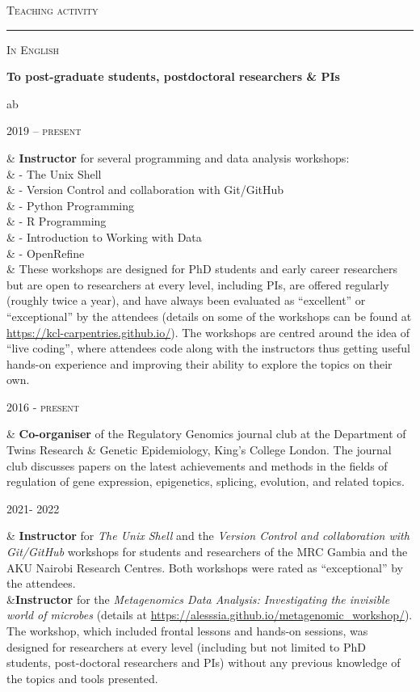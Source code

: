\documentclass[a4paper,10pt]{article}
\newcommand{\mediumtitle}[1]{
	\vspace{0.2cm}
	{\noindent
	\Large \textsc{#1}\\[-2ex]
	\hrule
	\vspace{0.2cm}}
}
\newcommand{\smalltitle}[1]{
	\vspace{0.1cm}
	{\noindent 
	\large \textsc{#1}}
	\vspace{0.1cm}
}
\newenvironment{singletablelist}
{	\vspace{-0.2cm}
	\begin{longtable}[!h]{ab}}{\end{longtable}
}
\newcommand{\stlist}[2]{
	\hspace{-3cm}
	\noindent
	\begin{minipage}{0.24\textwidth}
	\begin{flushright}
	\textsc{#1}
	\end{flushright}
	\end{minipage}
	& #2\\[0.2cm]
}
\begin{document}
\mediumtitle{Teaching activity}


\smalltitle{In English}

\vspace{0.2cm}

\noindent \textbf{To post-graduate students, postdoctoral researchers \& PIs}

\begin{singletablelist}
	
	\stlist{2019 -- present}{\textbf{Instructor} for several programming and data analysis workshops:\\
							& \hskip1cm - The Unix Shell\\
							& \hskip1cm - Version Control and collaboration with Git/GitHub\\
							& \hskip1cm - Python Programming\\
							& \hskip1cm - R Programming\\
							& \hskip1cm - Introduction to Working with Data\\
							& \hskip1cm - OpenRefine\\
							& These workshops are designed for PhD students and early career researchers but are open to researchers at every level, including PIs, are offered regularly (roughly twice a year), and have always been evaluated as ``excellent'' or ``exceptional'' by the attendees (details on some of the workshops can be found at \url{https://kcl-carpentries.github.io/}). The workshops are centred around the idea of ``live coding'', where attendees code along with the instructors thus getting useful hands-on experience and improving their ability to explore the topics on their own. }				
	
	\stlist{2016 - present}{\textbf{Co-organiser} of the Regulatory Genomics journal club at the Department of Twins Research \& Genetic Epidemiology, King's College London. The journal club discusses papers on the latest achievements and methods in the fields of regulation of gene expression, epigenetics, splicing, evolution, and related topics. }
	
	
	\stlist{2021- 2022}{\textbf{Instructor} for \emph{The Unix Shell} and the \emph{Version Control and collaboration with Git/GitHub} workshops for students and researchers of the MRC Gambia and the AKU Nairobi Research Centres. Both workshops were rated as ``exceptional'' by the attendees.  \\
					 &\textbf{Instructor} for the \emph{Metagenomics Data Analysis: Investigating the invisible world of microbes} (details at \url{https://alesssia.github.io/metagenomic_workshop/}). The workshop, which included frontal lessons and hands-on sessions, was designed for researchers at every level (including but not limited to PhD students, post-doctoral researchers and PIs) without any previous knowledge of the topics and tools presented.}

\end{singletablelist}
\end{document}
